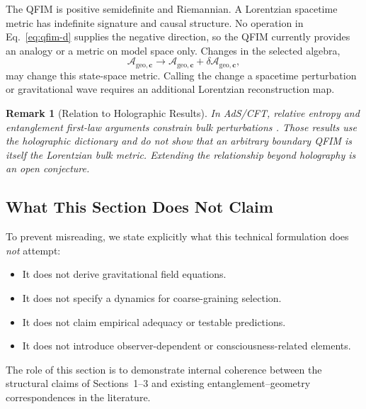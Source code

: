 \documentclass[12pt,a4paper]{article}
\newtheorem{remark}[theorem]{Remark}
\begin{document}
The QFIM is positive semidefinite and Riemannian.  A Lorentzian spacetime metric has indefinite signature and causal structure.  No operation in Eq.~\eqref{eq:qfim-d} supplies the negative direction, so the QFIM currently provides an analogy or a metric on model space only.  Changes in the selected algebra,
\begin{equation}
\mathcal{A}_{\mathrm{geo},\mathbf{c}} \to \mathcal{A}_{\mathrm{geo},\mathbf{c}} + \delta\mathcal{A}_{\mathrm{geo},\mathbf{c}},
\end{equation}
may change this state-space metric.  Calling the change a spacetime perturbation or gravitational wave requires an additional Lorentzian reconstruction map.

\begin{remark}[Relation to Holographic Results]
In AdS/CFT, relative entropy and entanglement first-law arguments constrain bulk perturbations \cite{Lashkari2014,Faulkner2014}.  Those results use the holographic dictionary and do not show that an arbitrary boundary QFIM is itself the Lorentzian bulk metric.  Extending the relationship beyond holography is an open conjecture.
\end{remark}

\subsection{What This Section Does Not Claim}

To prevent misreading, we state explicitly what this technical formulation does \emph{not} attempt:

\begin{itemize}
    \item It does not derive gravitational field equations.
    \item It does not specify a dynamics for coarse-graining selection.
    \item It does not claim empirical adequacy or testable predictions.
    \item It does not introduce observer-dependent or consciousness-related elements.
\end{itemize}

The role of this section is to demonstrate internal coherence between the structural claims of Sections~1--3 and existing entanglement--geometry correspondences in the literature.


\end{document}
